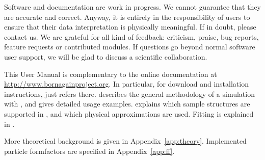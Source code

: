 Software and documentation are work in progress.
We cannot guarantee that they are accurate and correct.
Anyway, it is entirely in the responsibility of users
to ensure that their data interpretation is physically meaningful.
If in doubt, please contact us.
We are grateful for all kind of feedback:
criticism, praise, bug reports, feature requests or contributed modules.
If questions go beyond normal software user support,
we will be glad to discuss a scientific collaboration.

This User Manual is complementary to the online documentation
at \url{http://www.bornagainproject.org}.
In particular, for download and installation instructions,
 just refers there.
 describes
the general methodology of a simulation with \BornAgain,
and gives detailed usage examples.
 explains
which sample structures are supported in \BornAgain,
and which physical approximations are used.
Fitting is explained in .

More theoretical background is given in Appendix~\ref{app:theory}.
Implemented particle formfactors are specified in Appendix~\ref{app:ff}.
